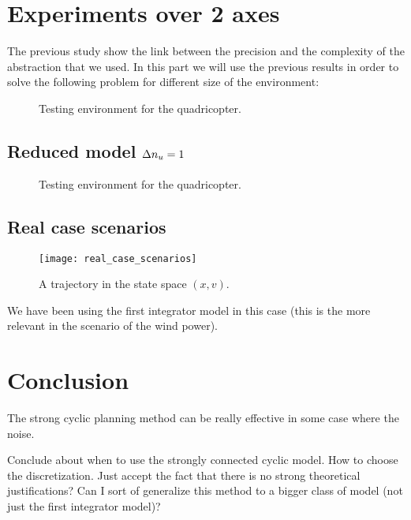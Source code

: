 \section{Experiments over 2 axes}
The previous study show the link between the precision and the complexity of the abstraction that we used.
In this part we will use the previous results in order to solve the following problem for different size of the environment:
\begin{figure}
	\center
	
	\caption{Testing environment for the quadricopter.}
	\label{fig:environment}
\end{figure}


\subsection{Reduced model $\Delta n_u = 1$}
\begin{figure}
	\center
	
	\caption{Testing environment for the quadricopter.}
	\label{fig:environment}
\end{figure}




\subsection{Real case scenarios}

\begin{figure}[!ht]
  \centering
  \texttt{[image: real\_case\_scenarios]}
  \caption{A trajectory in the state space $(x,v)$.}
\end{figure}

We have been using the first integrator model in this case (this is the more relevant in the scenario of the wind power).

\section{Conclusion}
The strong cyclic planning method can be really effective in some case where the noise.

Conclude about when to use the strongly connected cyclic model.
How to choose the discretization.
Just accept the fact that there is no strong theoretical justifications?
Can I sort of generalize this method to a bigger class of model (not just the first integrator model)?

